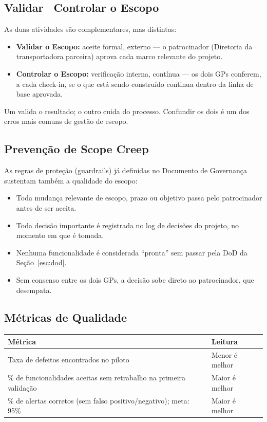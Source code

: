 \documentclass[11pt,a4paper]{article}
\begin{document}
\subsection{Validar \texttimes\ Controlar o Escopo}
As duas atividades são complementares, mas distintas:
\begin{itemize}[itemsep=3pt]
  \item \textbf{Validar o Escopo:} aceite formal, externo --- o patrocinador (Diretoria da transportadora parceira) aprova cada marco relevante do projeto.
  \item \textbf{Controlar o Escopo:} verificação interna, contínua --- os dois GPs conferem, a cada check-in, se o que está sendo construído continua dentro da linha de base aprovada.
\end{itemize}
\noindent Um valida o resultado; o outro cuida do processo. Confundir os dois é um dos erros mais comuns de gestão de escopo.

\subsection{Prevenção de Scope Creep}
As regras de proteção (guardrails) já definidas no Documento de Governança sustentam também a qualidade do escopo:
\begin{itemize}[itemsep=2pt]
  \item Toda mudança relevante de escopo, prazo ou objetivo passa pelo patrocinador antes de ser aceita.
  \item Toda decisão importante é registrada no log de decisões do projeto, no momento em que é tomada.
  \item Nenhuma funcionalidade é considerada ``pronta'' sem passar pela DoD da Seção~\ref{esc:dod}.
  \item Sem consenso entre os dois GPs, a decisão sobe direto ao patrocinador, que desempata.
\end{itemize}

\subsection{Métricas de Qualidade}
\begin{center}
\begin{tabularx}{\textwidth}{L l}
\toprule
\textbf{Métrica} & \textbf{Leitura} \\
\midrule
Taxa de defeitos encontrados no piloto & Menor é melhor \\
\% de funcionalidades aceitas sem retrabalho na primeira validação & Maior é melhor \\
\% de alertas corretos (sem falso positivo/negativo); meta: 95\% & Maior é melhor \\
\bottomrule
\end{tabularx}
\end{center}
\end{document}
